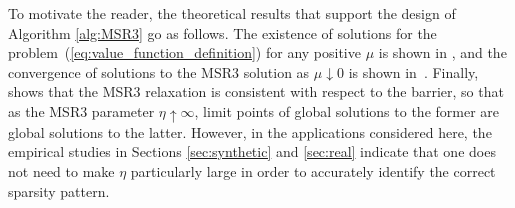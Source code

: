 
To motivate the reader, the theoretical results that support the design of Algorithm \ref{alg:MSR3} go as follows. The existence of solutions for the problem~(\ref{eq:value_function_definition}) for any positive $\mu$ is shown in \cite[Theorem 5]{Theory1}, and the convergence of solutions to the MSR3 solution as $\mu\downarrow 0$ is shown in~\cite[Theorem 7]{Theory1}.  
Finally, \cite[Theorem 6]{Theory1} shows that the MSR3 relaxation is consistent with respect to the barrier, so that as the MSR3 parameter $\eta \uparrow \infty$,
 limit points of global solutions to the former are global solutions to the latter. 
 However, in the applications considered here,
 the empirical studies in Sections \ref{sec:synthetic} and \ref{sec:real}
 indicate that one does not need to make $\eta$ particularly large in order to accurately identify the correct sparsity pattern. 




